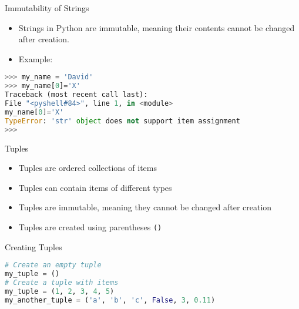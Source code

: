\begin{frame}[fragile]{Immutability of Strings}
    \begin{itemize}
        \item Strings in Python are immutable, meaning their contents cannot be changed after creation.
        \item Example:
    \end{itemize}
    \begin{lstlisting}[style=colorful, language=Python]
>>> my_name = 'David'
>>> my_name[0]='X'
Traceback (most recent call last):
File "<pyshell#84>", line 1, in <module>
my_name[0]='X'
TypeError: 'str' object does not support item assignment
>>>
    \end{lstlisting}
\end{frame}

\begin{frame}{Tuples}
    \begin{itemize}
        \item Tuples are ordered collections of items
        \item Tuples can contain items of different types
        \item Tuples are immutable, meaning they cannot be changed after creation
        \item Tuples are created using parentheses \texttt{()}
    \end{itemize}
\end{frame} 

\begin{frame}[fragile]{Creating Tuples}
    \begin{lstlisting}[style=colorful, language=Python]
# Create an empty tuple
my_tuple = ()
# Create a tuple with items
my_tuple = (1, 2, 3, 4, 5)
my_another_tuple = ('a', 'b', 'c', False, 3, 0.11)
    \end{lstlisting}        
\end{frame}

